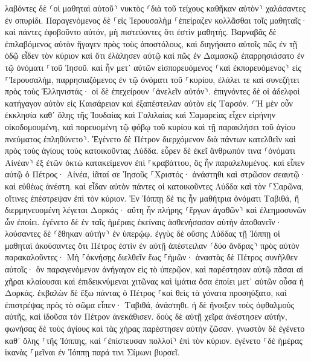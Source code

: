 \documentclass[twoside, 9pt]{extreport}
\begin{document}
λαβόντες δὲ ⸂οἱ μαθηταὶ αὐτοῦ⸃ νυκτὸς ⸂διὰ τοῦ τείχους καθῆκαν αὐτὸν⸃ χαλάσαντες ἐν σπυρίδι. 
Παραγενόμενος δὲ ⸀εἰς Ἰερουσαλὴμ ⸀ἐπείραζεν κολλᾶσθαι τοῖς μαθηταῖς· καὶ πάντες ἐφοβοῦντο αὐτόν, μὴ πιστεύοντες ὅτι ἐστὶν μαθητής. 
Βαρναβᾶς δὲ ἐπιλαβόμενος αὐτὸν ἤγαγεν πρὸς τοὺς ἀποστόλους, καὶ διηγήσατο αὐτοῖς πῶς ἐν τῇ ὁδῷ εἶδεν τὸν κύριον καὶ ὅτι ἐλάλησεν αὐτῷ καὶ πῶς ἐν Δαμασκῷ ἐπαρρησιάσατο ἐν τῷ ὀνόματι ⸀τοῦ Ἰησοῦ. 
καὶ ἦν μετ᾽ αὐτῶν εἰσπορευόμενος ⸂καὶ ἐκπορευόμενος⸃ εἰς ⸀Ἰερουσαλήμ, παρρησιαζόμενος ἐν τῷ ὀνόματι τοῦ ⸀κυρίου, 
ἐλάλει τε καὶ συνεζήτει πρὸς τοὺς Ἑλληνιστάς· οἱ δὲ ἐπεχείρουν ⸂ἀνελεῖν αὐτόν⸃. 
ἐπιγνόντες δὲ οἱ ἀδελφοὶ κατήγαγον αὐτὸν εἰς Καισάρειαν καὶ ἐξαπέστειλαν αὐτὸν εἰς Ταρσόν. 
⸂Ἡ μὲν οὖν ἐκκλησία καθ᾽ ὅλης τῆς Ἰουδαίας καὶ Γαλιλαίας καὶ Σαμαρείας εἶχεν εἰρήνην οἰκοδομουμένη, καὶ πορευομένη τῷ φόβῳ τοῦ κυρίου καὶ τῇ παρακλήσει τοῦ ἁγίου πνεύματος ἐπληθύνετο⸃. 
Ἐγένετο δὲ Πέτρον διερχόμενον διὰ πάντων κατελθεῖν καὶ πρὸς τοὺς ἁγίους τοὺς κατοικοῦντας Λύδδα. 
εὗρεν δὲ ἐκεῖ ἄνθρωπόν τινα ⸂ὀνόματι Αἰνέαν⸃ ἐξ ἐτῶν ὀκτὼ κατακείμενον ἐπὶ ⸀κραβάττου, ὃς ἦν παραλελυμένος. 
καὶ εἶπεν αὐτῷ ὁ Πέτρος· Αἰνέα, ἰᾶταί σε Ἰησοῦς ⸀Χριστός· ἀνάστηθι καὶ στρῶσον σεαυτῷ· καὶ εὐθέως ἀνέστη. 
καὶ εἶδαν αὐτὸν πάντες οἱ κατοικοῦντες Λύδδα καὶ τὸν ⸀Σαρῶνα, οἵτινες ἐπέστρεψαν ἐπὶ τὸν κύριον. 
Ἐν Ἰόππῃ δέ τις ἦν μαθήτρια ὀνόματι Ταβιθά, ἣ διερμηνευομένη λέγεται Δορκάς· αὕτη ἦν πλήρης ⸂ἔργων ἀγαθῶν⸃ καὶ ἐλεημοσυνῶν ὧν ἐποίει. 
ἐγένετο δὲ ἐν ταῖς ἡμέραις ἐκείναις ἀσθενήσασαν αὐτὴν ἀποθανεῖν· λούσαντες δὲ ⸂ἔθηκαν αὐτὴν⸃ ἐν ὑπερῴῳ. 
ἐγγὺς δὲ οὔσης Λύδδας τῇ Ἰόππῃ οἱ μαθηταὶ ἀκούσαντες ὅτι Πέτρος ἐστὶν ἐν αὐτῇ ἀπέστειλαν ⸂δύο ἄνδρας⸃ πρὸς αὐτὸν παρακαλοῦντες· Μὴ ⸀ὀκνήσῃς διελθεῖν ἕως ⸀ἡμῶν· 
ἀναστὰς δὲ Πέτρος συνῆλθεν αὐτοῖς· ὃν παραγενόμενον ἀνήγαγον εἰς τὸ ὑπερῷον, καὶ παρέστησαν αὐτῷ πᾶσαι αἱ χῆραι κλαίουσαι καὶ ἐπιδεικνύμεναι χιτῶνας καὶ ἱμάτια ὅσα ἐποίει μετ᾽ αὐτῶν οὖσα ἡ Δορκάς. 
ἐκβαλὼν δὲ ἔξω πάντας ὁ Πέτρος ⸀καὶ θεὶς τὰ γόνατα προσηύξατο, καὶ ἐπιστρέψας πρὸς τὸ σῶμα εἶπεν· Ταβιθά, ἀνάστηθι. ἡ δὲ ἤνοιξεν τοὺς ὀφθαλμοὺς αὐτῆς, καὶ ἰδοῦσα τὸν Πέτρον ἀνεκάθισεν. 
δοὺς δὲ αὐτῇ χεῖρα ἀνέστησεν αὐτήν, φωνήσας δὲ τοὺς ἁγίους καὶ τὰς χήρας παρέστησεν αὐτὴν ζῶσαν. 
γνωστὸν δὲ ἐγένετο καθ᾽ ὅλης ⸀τῆς Ἰόππης, καὶ ⸂ἐπίστευσαν πολλοὶ⸃ ἐπὶ τὸν κύριον. 
ἐγένετο ⸀δὲ ἡμέρας ἱκανὰς ⸀μεῖναι ἐν Ἰόππῃ παρά τινι Σίμωνι βυρσεῖ. 
\end{document}
